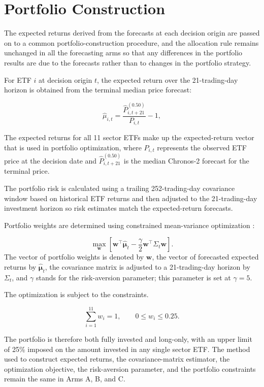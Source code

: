 \documentclass[12pt,a4paper,twoside,openany]{book}
\begin{document}
\section{Portfolio Construction}\label{portfolio-construction}

The expected returns derived from the forecasts at each decision origin are passed on to a common portfolio-construction procedure, and the allocation rule remains unchanged in all the forecasting arms so that any differences in the portfolio results are due to the forecasts rather than to changes in the portfolio strategy.

For ETF \(i\) at decision origin \(t\), the expected return over the 21-trading-day horizon is obtained from the terminal median price forecast:

\[
\hat{\mu}_{i,t}
=
\frac{\hat{P}^{(0.50)}_{i,t+21}}
     {P_{i,t}}
-1,
\]

The expected returns for all 11 sector ETFs make up the expected-return vector that is used in portfolio optimization, where \(P_{i,t}\) represents the observed ETF price at the decision date and \(\hat{P}^{(0.50)}_{i,t+21}\) is the median Chronos-2 forecast for the terminal price.

The portfolio risk is calculated using a trailing 252-trading-day covariance window based on historical ETF returns and then adjusted to the 21-trading-day investment horizon so risk estimates match the expected-return forecasts.

Portfolio weights are determined using constrained mean-variance optimization \cite{markowitz1952portfolio}:

\[
\max_{\mathbf{w}}
\left[
\mathbf{w}^{\top}\hat{\boldsymbol{\mu}}_{t}
-
\frac{\gamma}{2}
\mathbf{w}^{\top}\Sigma_t\mathbf{w}
\right].
\]
The vector of portfolio weights is denoted by \(\mathbf{w}\), the vector of forecasted expected returns by \(\hat{\boldsymbol{\mu}}_{t}\), the covariance matrix is adjusted to a 21-trading-day horizon by \(\Sigma_t\), and \(\gamma\) stands for the risk-aversion parameter; this parameter is set at \(\gamma=5\).

The optimization is subject to the constraints.

\[
\sum_{i=1}^{11} w_i = 1,
\qquad
0 \leq w_i \leq 0.25.
\]

The portfolio is therefore both fully invested and long-only, with an upper limit of 25\% imposed on the amount invested in any single sector ETF. The method used to construct expected returns, the covariance-matrix estimator, the optimization objective, the risk-aversion parameter, and the portfolio constraints remain the same in Arms A, B, and C.
\end{document}
